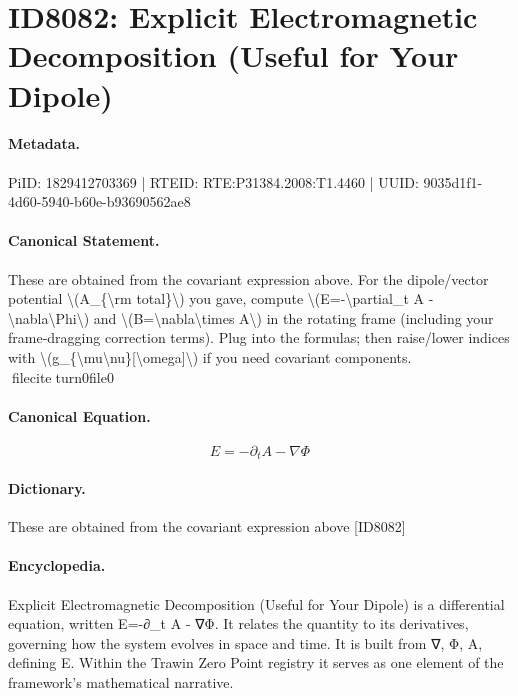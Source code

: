 \section*{ID8082: Explicit Electromagnetic Decomposition (Useful for Your Dipole)}
\paragraph{Metadata.}
PiID: 1829412703369 | RTEID: RTE:P31384.2008:T1.4460 | UUID: 9035d1f1-4d60-5940-b60e-b93690562ae8

\paragraph{Canonical Statement.}
These are obtained from the covariant expression above. For the dipole/vector potential \textbackslash{}(A\_\{\textbackslash{}rm total\}\textbackslash{}) you gave, compute \textbackslash{}(E=-\textbackslash{}partial\_t A - \textbackslash{}nabla\textbackslash{}Phi\textbackslash{}) and \textbackslash{}(B=\textbackslash{}nabla\textbackslash{}times A\textbackslash{}) in the rotating frame (including your frame-dragging correction terms). Plug into the formulas; then raise/lower indices with \textbackslash{}(g\_\{\textbackslash{}mu\textbackslash{}nu\}[\textbackslash{}omega]\textbackslash{}) if you need covariant components. fileciteturn0file0

\paragraph{Canonical Equation.}
\[
E=-\partial_t A - \nabla\Phi
\]

\paragraph{Dictionary.}
These are obtained from the covariant expression above [ID8082]

\paragraph{Encyclopedia.}
Explicit Electromagnetic Decomposition (Useful for Your Dipole) is a differential equation, written E=-∂\_t A - ∇Φ. It relates the quantity to its derivatives, governing how the system evolves in space and time. It is built from ∇, Φ, A, defining E. Within the Trawin Zero Point registry it serves as one element of the framework's mathematical narrative.
